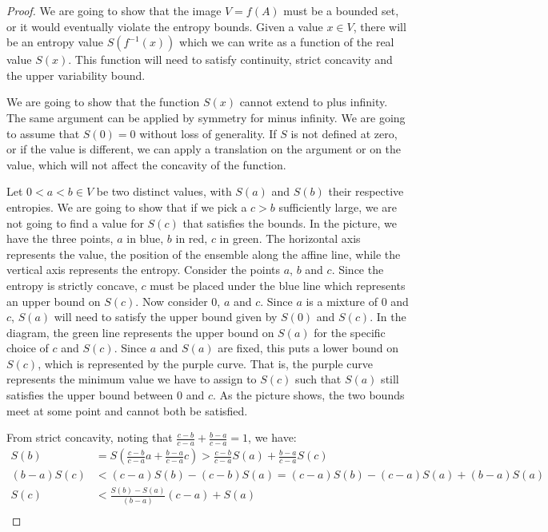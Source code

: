 \begin{mathSection}
\begin{proof}
	We are going to show that the image $V=f(A)$ must be a bounded set, or it would eventually violate the entropy bounds. Given a value $x \in V$, there will be an entropy value $S(f^{-1}(x))$ which we can write as a function of the real value $S(x)$. This function will need to satisfy continuity, strict concavity and the upper variability bound.

	We are going to show that the function $S(x)$ cannot extend to plus infinity. The same argument can be applied by symmetry for minus infinity. We are going to assume that $S(0) = 0$ without loss of generality. If $S$ is not defined at zero, or if the value is different, we can apply a translation on the argument or on the value, which will not affect the concavity of the function.
	
	Let $0 < a < b \in V$ be two distinct values, with $S(a)$ and $S(b)$ their respective entropies. We are going to show that if we pick a $c > b$ sufficiently large, we are not going to find a value for $S(c)$ that satisfies the bounds. In the picture, we have the three points, $a$ in blue, $b$ in red, $c$ in green. The horizontal axis represents the value, the position of the ensemble along the affine line, while the vertical axis represents the entropy. Consider the points $a$, $b$ and $c$. Since the entropy is strictly concave, $c$ must be placed under the blue line which represents an upper bound on $S(c)$. Now consider $0$, $a$ and $c$. Since $a$ is a mixture of $0$ and $c$, $S(a)$ will need to satisfy the upper bound given by $S(0)$ and $S(c)$. In the diagram, the green line represents the upper bound on $S(a)$ for the specific choice of $c$ and $S(c)$. Since $a$ and $S(a)$ are fixed, this puts a lower bound on $S(c)$, which is represented by the purple curve. That is, the purple curve represents the minimum value we have to assign to $S(c)$ such that $S(a)$ still satisfies the upper bound between $0$ and $c$. As the picture shows, the two bounds meet at some point and cannot both be satisfied.
	
	From strict concavity, noting that $\frac{c-b}{c-a} + \frac{b-a}{c-a} = 1$, we have:
	\begin{equation}
		\begin{aligned}
			S(b) &= S\left(\frac{c-b}{c-a} a + \frac{b-a}{c-a} c\right) > \frac{c-b}{c-a} S(a) + \frac{b-a}{c-a} S(c)\\
			(b-a)S(c) &< (c-a) S(b) - (c-b) S(a) = (c-a) S(b) - (c-a) S(a) + (b-a) S(a) \\
			S(c) &< \frac{S(b) - S(a)}{(b-a)} (c-a) + S(a) \\
		\end{aligned}
	\end{equation}
	

\end{proof}
\end{mathSection}
